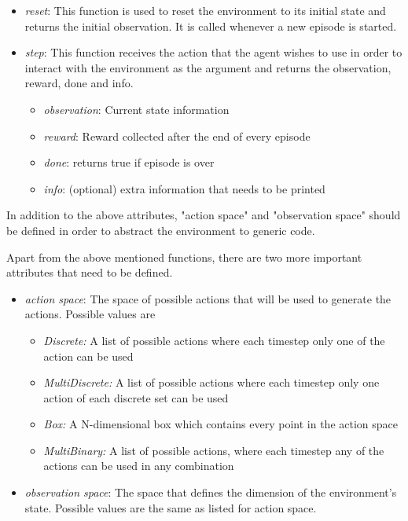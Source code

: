 \documentclass[12pt]{report}
\begin{document}
\begin{itemize}
    \item \emph{reset}: This function is used to reset the environment to its initial state and returns the initial observation. It is called whenever a new episode is started. 
    \item \emph{step}: This function receives the action that the agent wishes to use in order to interact with the environment as the argument and returns the observation, reward, done and info. 
    \begin{itemize}
        \item \emph{observation}: Current state information
        \item \emph{reward}: Reward collected after the end of every episode
        \item \emph{done}: returns true if episode is over
        \item\emph{info}: (optional) extra information that needs to be printed
    \end{itemize}
\end{itemize}

In addition to the above attributes, "action space" and "observation space" should be defined in order to abstract the environment to generic code. 

Apart from the above mentioned functions, there are two more important attributes that need to be defined. 

\begin{itemize}
    \item \emph{action space}: The space of possible actions that will be used to generate the actions. Possible values are 
    \begin{itemize}
        \item \emph{Discrete:} A list of possible actions where each timestep only one of the action can be used
        \item \emph{MultiDiscrete:} A list of possible actions where each timestep only one action of each discrete set can be used
        \item \emph{Box:} A N-dimensional box which contains every point in the action space
        \item \emph{MultiBinary:} A list of possible actions, where each timestep any of the actions can be used in any combination
    \end{itemize}
    
    \item \emph{observation space}: The space that defines the dimension of the environment's state. Possible values are the same as listed for action space. 
\end{itemize}
\end{document}
